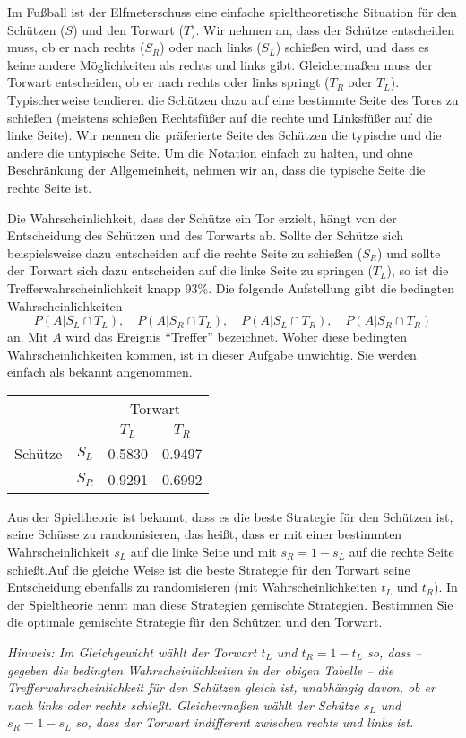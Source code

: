 \begin{Exercise}
Im Fußball ist der Elfmeterschuss eine einfache spieltheoretische Situation für den Schützen ($S$) und den Torwart ($T$). Wir nehmen an, dass der Schütze entscheiden muss, ob er nach rechts ($S_R$) oder nach links ($S_L$) schießen wird, und dass es keine andere Möglichkeiten als rechts und links gibt. Gleichermaßen muss der Torwart entscheiden, ob er nach rechts oder links springt ($T_R$ oder $T_L$). Typischerweise tendieren die Schützen dazu auf eine bestimmte Seite des Tores zu schießen (meistens schießen Rechtsfüßer auf die rechte und Linksfüßer auf die linke Seite). Wir nennen die präferierte Seite des Schützen die typische und die andere die untypische Seite. Um die Notation einfach zu halten, und ohne Beschränkung der Allgemeinheit, nehmen wir an, dass die typische Seite die rechte Seite ist. 

Die Wahrscheinlichkeit, dass der Schütze ein Tor erzielt, hängt von der Entscheidung des Schützen und des Torwarts ab. Sollte der Schütze sich beispielsweise dazu entscheiden auf die rechte Seite zu schießen ($S_R$) und sollte der Torwart sich dazu entscheiden auf die linke Seite zu springen ($T_L$), so ist die Trefferwahrscheinlichkeit knapp 93\%. Die folgende Aufstellung gibt die bedingten Wahrscheinlichkeiten
\[
P(A|S_L\cap T_L),\quad P(A|S_R\cap T_L),\quad P(A|S_L\cap T_R),\quad P(A|S_R\cap T_R)
\]
an. Mit $A$ wird das Ereignis ``Treffer'' bezeichnet. Woher diese bedingten Wahrscheinlichkeiten kommen, ist in dieser Aufgabe unwichtig. Sie werden einfach als bekannt angenommen.

\begin{center}
	\begin{tabular}{cc|cc}
		&  & \multicolumn{2}{|c}{Torwart} \\
		&  & $T_L$ & $T_R$ \\ \cline{2-4}
		Schütze& $S_L$ & 0.5830 & 0.9497 \\
		& $S_R$ & 0.9291 & 0.6992
	\end{tabular}
\end{center}

Aus der Spieltheorie ist bekannt, dass es die beste Strategie für den Schützen ist, seine Schüsse zu randomisieren, das heißt, dass er mit einer bestimmten Wahrscheinlichkeit $s_L$ auf die linke Seite und mit $s_R=1-s_L$ auf die rechte Seite schießt.Auf die gleiche Weise ist die beste Strategie für den Torwart seine Entscheidung ebenfalls zu randomisieren (mit Wahrscheinlichkeiten $t_L$ und $t_R$). In der Spieltheorie nennt man diese Strategien gemischte Strategien.
Bestimmen Sie die optimale gemischte Strategie für den Schützen und den Torwart.

\textit{Hinweis: Im Gleichgewicht wählt der Torwart $t_L$ und $t_R=1-t_L$ so, dass -- gegeben die bedingten Wahrscheinlichkeiten in der obigen Tabelle -- die Trefferwahrscheinlichkeit für den Schützen gleich ist, unabhängig davon, ob er nach links oder rechts schießt. Gleichermaßen wählt der Schütze $s_L$ und $s_R=1-s_L$ so, dass der Torwart indifferent zwischen rechts und links ist.}
\end{Exercise}


